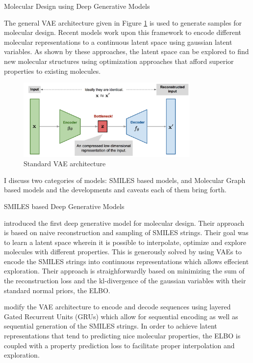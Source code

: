 \documentclass{article}
\begin{document}
\begin{psection}{Molecular Design using Deep Generative Models}

	The general VAE architecture given in Figure \ref{fig:vae} is used to generate samples for molecular design. Recent models \citep{cvae, gvae, sd-vae, cgvae, jtvae} work upon this framework to encode different molecular representations to a continuous latent space using gaussian latent variables. As shown by these approaches, the latent space can be explored to find new molecular structures using optimization approaches \citep{jtvae} that afford superior properties to existing molecules.

	\begin{figure}[htpb]
		\centering
		\includegraphics[width=0.8\textwidth]{includes/vae.png}
		\caption{Standard VAE architecture}
		\label{fig:vae}
	\end{figure}

	I discuss two categories of models: SMILES based models, and Molecular Graph based models and the developments and caveats each of them bring forth.

	\begin{psubsection}{SMILES based Deep Generative Models}

		\cite{cvae} introduced the first deep generative model for molecular design. Their approach is based on naive reconstruction and sampling of SMILES strings. Their goal was to learn a latent space wherein it is possible to interpolate, optimize and explore molecules with different properties. This is generously solved by using VAEs to encode the SMILES strings into continuous representations which allows effecient exploration. Their approach is straighforwardly based on minimizing the sum of the reconstruction loss and the kl-divergence of the gaussian variables with their standard normal priors, \ie the ELBO.

		\cite{cvae} modify the VAE architecture to encode and decode sequences using layered Gated Recurrent Units (GRUs) which allow for sequential encoding as well as sequential generation of the SMILES strings. In order to achieve latent representations that tend to predicting nice molecular properties, the ELBO is coupled with a property prediction loss to facilitate proper interpolation and exploration. 


\end{psubsection}
\end{psection}
\end{document}
